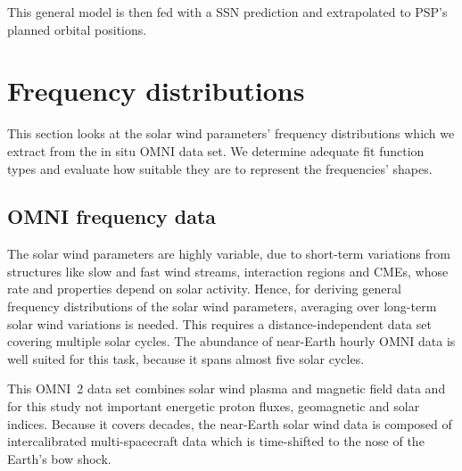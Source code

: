 This general model is then fed with a SSN prediction and extrapolated to PSP's planned orbital positions.\\


\section{Frequency distributions}
\label{sec:frequency_distribution}

This section looks at the solar wind parameters' frequency distributions which we extract from the in situ OMNI data set. We determine adequate fit function types and evaluate how suitable they are to represent the frequencies' shapes.

\subsection{OMNI frequency data}
\label{sec:omni_frequency_data}
The solar wind parameters are highly variable, due to short-term variations from structures like slow and fast wind streams, interaction regions and CMEs, whose rate and properties depend on solar activity. Hence, for deriving general frequency distributions of the solar wind parameters, averaging over long-term solar wind variations is needed. This requires a distance-independent data set covering multiple solar cycles. The abundance of near-Earth hourly OMNI data is well suited for this task, because it spans almost five solar cycles.

This OMNI~2 data set \citep{King2005} combines solar wind plasma and magnetic field data and for this study not important energetic proton fluxes, geomagnetic and solar indices. Because it covers decades, the near-Earth solar wind data is composed of intercalibrated multi-spacecraft data which is time-shifted to the nose of the Earth's bow shock.

